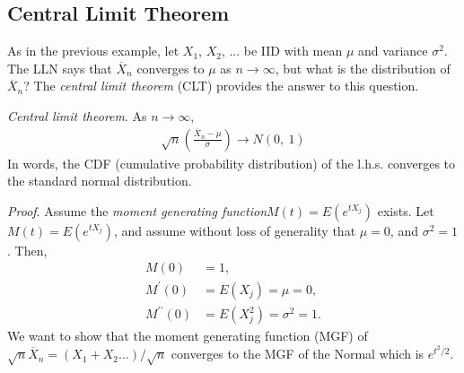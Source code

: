 \subsection{Central Limit Theorem}

As in the previous example, 
let \(X_{1}\), \(X_{2}\), ... be IID with mean \(\mu\) 
and variance \(\sigma^{2}\). 
The LLN says that \({\overline{X}}_{n}\) converges to \(\mu\) as \(n \rightarrow \infty\),
but what is the distribution of \({\overline{X}}_{n}\)? 
The \emph{central limit theorem} (CLT) provides the answer to this question.

\emph{Central limit theorem}. As \(n \rightarrow \infty\),
\begin{align}
\sqrt{n}\left( \frac{{\overline{X}}_{n} - \mu}{\sigma} \right) \rightarrow N(0,\ 1)
\end{align}
In words, 
the CDF (cumulative probability distribution) of the l.h.s.
converges to the standard normal distribution.

\emph{Proof}. Assume the \emph{moment generating function}\(M(t) = E(e^{tX_{j}})\) exists.
Let \(M(t) = E(e^{tX_{j}})\), 
and assume without loss of generality that \(\mu = 0\), 
and \(\sigma^{2} = 1\). 
Then, 
\begin{equation}
\begin{split}
M(0) &= 1,\\
M^{\prime}(0) &= E(X_{j}) = \mu = 0,\\
M^{\prime\prime}(0) &= E\left( X_{j}^{2} \right) = \sigma^{2} = 1.
\end{split}
\end{equation}
We want to show that the moment generating function (MGF) of
\(\sqrt{n}\overline{X}_{n} = (X_{1} + X_{2}\ldots)/\sqrt{n}\)
converges to the MGF of the Normal which is \(e^{t^{2}/2}\).

